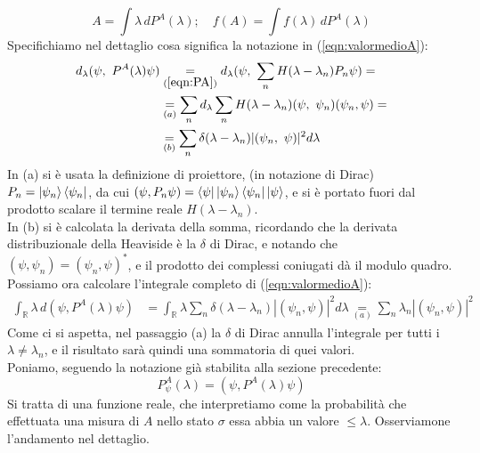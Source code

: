 \begin{equation}
A=\int \lambda\, dP^A(\lambda); \quad f(A) = \int f(\lambda)\,dP^A(\lambda)
\label{eqn:operatoreformale}
\end{equation}
Specifichiamo nel dettaglio cosa significa la notazione in (\ref{eqn:valormedioA}):
\begin{align*}
d_\lambda (\psi,\ P^A (\lambda )\psi )&\underset{(\ref{eqn:PA})}{=}d_\lambda (\psi,\ \sum_{n} H(\lambda-\lambda_n )P_n\psi )=\\
&\underset{(a)}{=}\sum_{n} d_\lambda\sum_{n} H (\lambda-\lambda_n ) (\psi,\ \psi_n ) (\psi_n,\psi )=\\
&\underset{(b)}{=}\sum_n \delta (\lambda-\lambda_n ) |(\psi_n,\ \psi)|^2 d\lambda
\end{align*}
In (a) si è usata la definizione di proiettore, (in notazione di Dirac) $P_n = \ket{\psi_n}\bra{\psi_n}$, da cui $(\psi, P_n \psi) = \bra{\psi}\ket{\psi_n}\bra{\psi_n}\ket{\psi}$, e si è portato fuori dal prodotto scalare il termine reale $H(\lambda-\lambda_n)$.\\
In (b) si è calcolata la derivata della somma, ricordando che la derivata distribuzionale della Heaviside è la $\delta$ di Dirac, e notando che $(\psi, \psi_n) = (\psi_n,\psi)^*$, e il prodotto dei complessi coniugati dà il modulo quadro.\\
Possiamo ora calcolare l'integrale completo di (\ref{eqn:valormedioA}):
\begin{align*}
\int_{\mathbb{R}}\lambda\,d (\psi,P^A (\lambda )\psi )&=\int_{\mathbb{R}}\lambda\sum_{n}\delta (\lambda-\lambda_n )
 |(\psi_n,\psi)|^2 d\lambda\underset{(a)}{=}\sum_{n}\lambda_n |(\psi_n,\psi)|^2
\end{align*}
Come ci si aspetta, nel passaggio (a) la $\delta$ di Dirac annulla l'integrale per tutti i $\lambda\neq \lambda_n$, e il risultato sarà quindi una sommatoria di quei valori.\\
Poniamo, seguendo la notazione già stabilita alla sezione precedente:
\[ 
P_\psi^A(\lambda) = (\psi, P^A(\lambda)\psi)
\]
Si tratta di una funzione reale, che interpretiamo come la probabilità che effettuata una misura di $A$ nello stato $\sigma$ essa abbia un valore $\leq \lambda$. Osserviamone l'andamento nel dettaglio.

